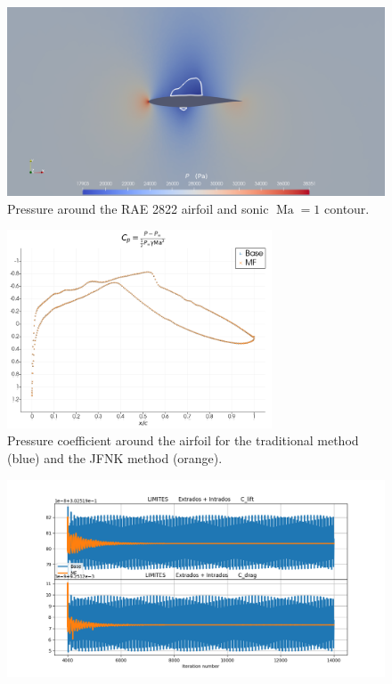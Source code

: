         \begin{figure}
          \centering
          \includegraphics[width=\textwidth]{figures/rae_field.png}
          \caption{Pressure around the RAE 2822 airfoil and sonic $\operatorname{Ma} = 1$ contour.}
          \label{fig:rae_field}
        \end{figure}

        \begin{figure}
          \centering
          \includegraphics[width=0.7\textwidth]{figures/rae_cp.png}
          \caption{Pressure coefficient around the airfoil for the traditional method (blue) and the JFNK method (orange).}
          \label{fig:rae_cp}
        \end{figure}

        \begin{figure}
          \centering
          \includegraphics[width=\textwidth]{figures/rae_coefficients.png}
          \caption{}
          \label{fig:rae_coefficients}
        \end{figure}

